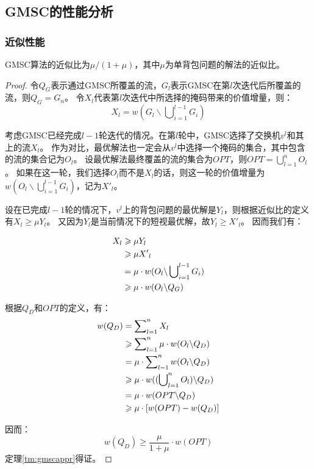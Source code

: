 \subsection{GMSC的性能分析}
\subsubsection{近似性能}
\begin{theorem}\label{tm:gmscappr}
    GMSC算法的近似比为$\mu/(1+\mu)$，其中$\mu$为单背包问题的解法的近似比。
\end{theorem}

\begin{proof}
令$Q_G$表示通过GMSC所覆盖的流，$G_l$表示GMSC在第$l$次迭代后所覆盖的流，则$Q_G = G_n$。
令$X_l$代表第$l$次迭代中所选择的掩码带来的价值增量，则：
\begin{equation}
X_l =w(G_l \backslash \bigcup\nolimits^{l-1}_{i=1}G_i)
\end{equation}

考虑GMSC已经完成$l-1$轮迭代的情况。在第$l$轮中，GMSC选择了交换机$v^l$和其上的流$X_l$。
作为对比，最优解法也一定会从$v^l$中选择一个掩码的集合，其中包含的流的集合记为$O_l$。
设最优解法最终覆盖的流的集合为$OPT$，则$OPT = \bigcup\nolimits_{l=1}^{n}O_l$。
如果在这一轮，我们选择$O_l$而不是$X_l$的话，则这一轮的价值增量为$w(O_l \backslash \bigcup\nolimits^{l-1}_{i=1}G_i)$，记为${X'}_l$。

设在已完成$l-1$轮的情况下，$v^l$上的背包问题的最优解是$Y_l$，则根据近似比的定义有$X_l \ge \mu Y_l$。
又因为$Y_l$是当前情况下的短视最优解，故$Y_l \ge {X'}_l$。
因而我们有：

\begin{align}
    X_l &\ge \mu Y_l \notag\\
        &\ge \mu {X'}_l \notag\\
        &= \mu \cdot w(O_l \backslash \bigcup\nolimits^{l-1}_{i=1}G_i) \notag\\
        &\ge \mu \cdot w(O_l \backslash Q_G) \notag
\end{align}

根据$Q_D$和$OPT$的定义，有：
\begin{align}
    w(Q_D)&=\sum\nolimits_{l=1}^{n} X_l \notag\\
        &\ge \sum\nolimits_{l=1}^{n} \mu \cdot w(O_l \backslash Q_D) \notag\\
        &=  \mu \cdot \sum\nolimits_{l=1}^{n} w(O_l \backslash Q_D) \notag\\
        &\ge \mu \cdot w ((\bigcup\nolimits_{l=1}^{n}O_l) \backslash Q_D) \notag\\
        &=  \mu \cdot w( OPT \backslash Q_D) \notag\\
        &\ge \mu \cdot [ w(OPT)-w(Q_D)] \notag
\end{align}

因而：
\begin{equation}\label{eq:gmscappr}
    w(Q_D) \ge \frac{\mu }{1+\mu} \cdot w(OPT)
\end{equation}
定理\ref{tm:gmscappr}得证。
\end{proof}

